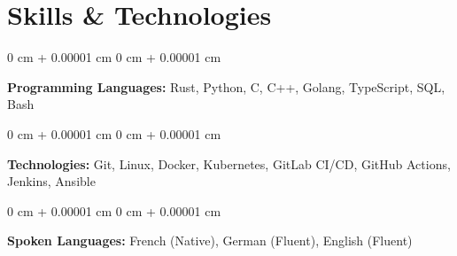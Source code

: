 \documentclass[10pt, letterpaper]{article}
\newenvironment{onecolentry}{
    \begin{adjustwidth}{
        0 cm + 0.00001 cm
    }{
        0 cm + 0.00001 cm
    }
}{
    \end{adjustwidth}
}
\begin{document}
    \section{Skills \& Technologies}

    \begin{onecolentry}
        \textbf{Programming Languages:} Rust, Python, C, C++, Golang, TypeScript, SQL, Bash
    \end{onecolentry}

    \vspace{0.2 cm}

    \begin{onecolentry}
        \textbf{Technologies:} Git, Linux, Docker, Kubernetes, GitLab CI/CD, GitHub Actions, Jenkins, Ansible
    \end{onecolentry}

    \vspace{0.2 cm}

    \begin{onecolentry}
        \textbf{Spoken Languages:} French (Native), German (Fluent), English (Fluent)
    \end{onecolentry}
\end{document}
